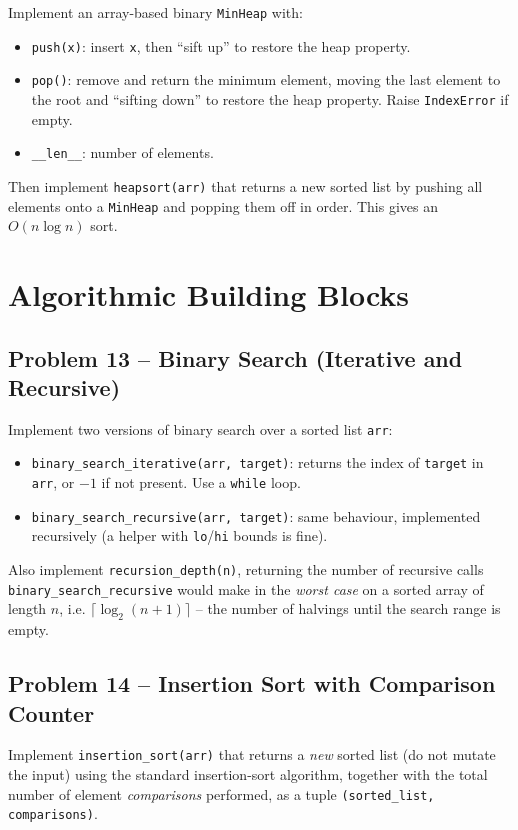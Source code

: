 \documentclass[11pt]{article}
\begin{document}
Implement an array-based binary \texttt{MinHeap} with:
\begin{itemize}
    \item \texttt{push(x)}: insert \texttt{x}, then ``sift up'' to restore the heap
    property.
    \item \texttt{pop()}: remove and return the minimum element, moving the last element
    to the root and ``sifting down'' to restore the heap property. Raise
    \texttt{IndexError} if empty.
    \item \texttt{\_\_len\_\_}: number of elements.
\end{itemize}
Then implement \texttt{heapsort(arr)} that returns a new sorted list by pushing all
elements onto a \texttt{MinHeap} and popping them off in order. This gives an
$O(n\log n)$ sort.

\newpage
\section{Algorithmic Building Blocks}

\subsection*{Problem 13 -- Binary Search (Iterative and Recursive)}

Implement two versions of binary search over a sorted list \texttt{arr}:
\begin{itemize}
    \item \texttt{binary\_search\_iterative(arr, target)}: returns the index of
    \texttt{target} in \texttt{arr}, or $-1$ if not present. Use a \texttt{while} loop.
    \item \texttt{binary\_search\_recursive(arr, target)}: same behaviour, implemented
    recursively (a helper with \texttt{lo}/\texttt{hi} bounds is fine).
\end{itemize}
Also implement \texttt{recursion\_depth(n)}, returning the number of recursive calls
\texttt{binary\_search\_recursive} would make in the \emph{worst case} on a sorted array
of length $n$, i.e. $\lceil \log_2(n+1) \rceil$ -- the number of halvings until the search
range is empty.

\subsection*{Problem 14 -- Insertion Sort with Comparison Counter}

Implement \texttt{insertion\_sort(arr)} that returns a \emph{new} sorted list (do not
mutate the input) using the standard insertion-sort algorithm, together with the total
number of element \emph{comparisons} performed, as a tuple
\texttt{(sorted\_list, comparisons)}.
\end{document}

